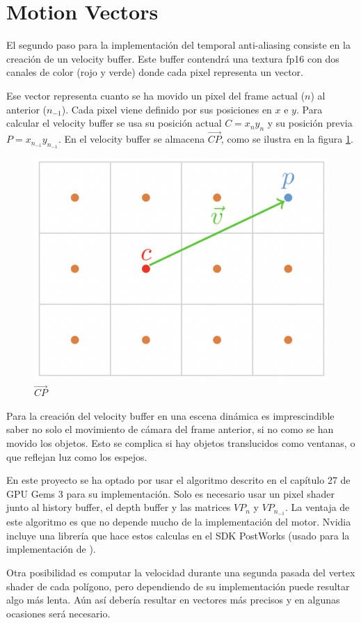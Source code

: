 \documentclass[withindex, glossary]{cam-thesis}
\begin{document}
\section{Motion Vectors}

El segundo paso para la implementación del temporal anti-aliasing consiste en la creación de un velocity buffer. Este buffer contendrá una textura fp16 con dos canales de color (rojo y verde) donde cada pixel representa un vector.

Ese vector representa cuanto se ha movido un pixel del frame actual ($n$) al anterior ($n_{-1}$). Cada pixel viene definido por sus posiciones en $x$ e $y$. Para calcular el velocity buffer se usa su posición actual $C = x_{n}y_{n}$ y su posición previa $P = x_{n_{-1}}y_{n_{-1}}$. En el velocity buffer se almacena $\vec{CP}$, como se ilustra en la figura \ref{vec}.

\begin{figure}[!htbp]
    \includegraphics[width=.5\linewidth]{figures/vec.png}
    \caption{$\vec{CP}$\cite{filmicsmaa}}
    \label{vec}
\end{figure}

Para la creación del velocity buffer en una escena dinámica es imprescindible saber no solo el movimiento de cámara del frame anterior, si no como se han movido los objetos. Esto se complica si hay objetos translucidos como ventanas, o que reflejan luz como los espejos\cite{uncharted4}.

En este proyecto se ha optado por usar el algoritmo descrito en el capítulo 27 de GPU Gems 3\cite{Nguyen:2007:GG:1407436} para su implementación. Solo es necesario usar un pixel shader junto al history buffer, el depth buffer y las matrices $VP_{n}$ y $VP_{n_{-1}}$. La ventaja de este algoritmo es que no depende mucho de la implementación del motor. Nvidia incluye una librería que hace estos calculas en el SDK PostWorks\cite{postworks} (usado para la implementación de ).

Otra posibilidad es computar la velocidad durante una segunda pasada del vertex shader de cada polígono, pero dependiendo de su implementación puede resultar algo más lenta. Aún así debería resultar en vectores más precisos y en algunas ocasiones será necesario\cite{asscreed}.
\end{document}
